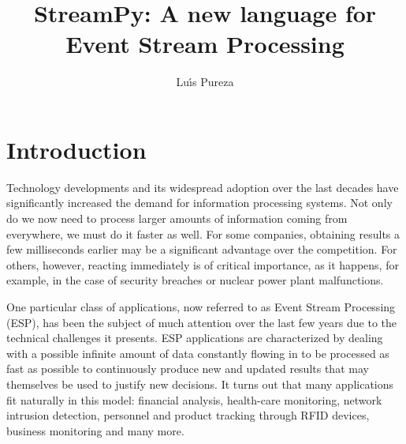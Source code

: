 \documentclass{report}
\begin{document}
\title{StreamPy: A new language for Event Stream Processing}
\author{Lu\'{\i}s Pureza}

\maketitle

\tableofcontents

\addtolength{\parskip}{\baselineskip}
\chapter{Introduction}

Technology developments and its widespread adoption over the last
decades have significantly increased the demand for information
processing systems. Not only do we now need to process larger amounts
of information coming from everywhere, we must do it faster as
well. For some companies, obtaining results a few milliseconds earlier
may be a significant advantage over the competition. For others,
however, reacting immediately is of critical importance, as it
happens, for example, in the case of security breaches or nuclear
power plant malfunctions.

One particular class of applications, now referred to as Event Stream
Processing (ESP), has been the subject of much attention over the last
few years due to the technical challenges it presents. ESP
applications are characterized by dealing with a possible infinite
amount of data constantly flowing in to be processed as fast as
possible to continuously produce new and updated results that may
themselves be used to justify new decisions. It turns out that many
applications fit naturally in this model: financial analysis,
health-care monitoring, network intrusion detection, personnel and
product tracking through RFID devices, business monitoring and many
more.
\end{document}
